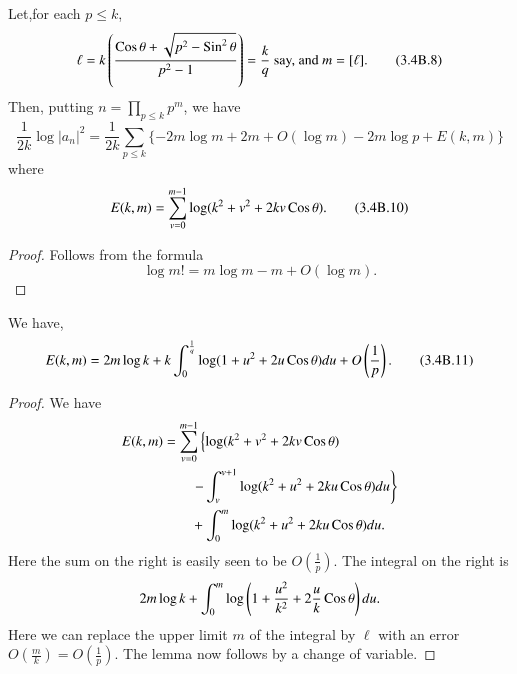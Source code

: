 \begin{alphlemma}\label{c3:lem3.4B.1}
Let,\pageoriginale for each $p\leq k$,
\begin{equation*}
\ell =k \left( \frac{\operatorname{Cos} \theta + \sqrt{p^2 -\operatorname{Sin}^2 \theta}}{p^2-1}\right) = \frac{k}{q} \text{ say, and }  m = [\ell].  \tag{3.4B.8}\label{c3:eq3.4B.8}
\end{equation*}
Then, putting $n = \prod\limits_{p\leq k } p^m$, we have
\begin{equation*}
\frac{1}{2k} \log |a_n|^2 =\frac{1}{2k} \sum\limits_{p\leq k} \{ - 2m \log m+ 2 m + O(\log m) - 2m \log p + E (k,m) \} \tag{3.4B.9}\label{c3:eq3.4B.9}
\end{equation*}
where
\begin{equation*}
E(k,m) = \sum\limits^{m-1}_{v=0} \log (k^2 + v^2 + 2kv \operatorname{Cos} \theta) . \tag{3.4B.10}\label{c3:eq3.4B.10}
\end{equation*}
\end{alphlemma}

\begin{proof}
Follows from the formula 
$$
\log m! = m \log m - m + O(\log m). 
$$
\end{proof}

\begin{alphlemma}\label{c3:lem3.4B.2}
We have,
\begin{equation*}
E(k,m) = 2m \log k + k \int^{\frac{1}{q}}_0 \log (1+ u^2 + 2u \operatorname{Cos} \theta) du + O\left( \frac{1}{p} \right) . \tag{3.4B.11}\label{c3:eq3.4B.11}
\end{equation*}
\end{alphlemma}

\begin{proof}
We have
\begin{align*}
E(k,m) &= \sum\limits^{m-1}_{v=0} \left\{ \log (k^2 + v^2 + 2kv \operatorname{Cos}
\theta)\right.\\ 
&\left.\qquad - \int^{v+1}_v \log (k^2 + u^2 + 2ku \operatorname{Cos} \theta) du \right\}\\
&\qquad + \int^m_0 \log (k^2 + u^2 + 2ku \operatorname{Cos} \theta) du.
\end{align*}
Here the sum on the right is easily seen to be $O\left(\frac{1}{p} \right)$. The integral on the right is 
$$
2m  \log k + \int^m_0 \log \left( 1+ \frac{u^2}{k^2} + 2 \frac{u}{k} \operatorname{Cos} \theta\right) du. 
$$
Here we can replace the upper limit $m$ of the integral by $\ell$ with an error $O(\frac{m}{k}) = O(\frac{1}{p})$. The lemma now follows by a change of variable.
\end{proof}

